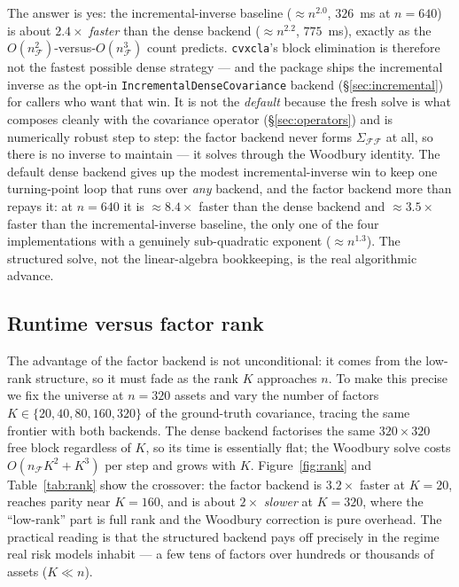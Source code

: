 \documentclass[11pt]{article}
\newcommand{\Sig}{\Sigma}
\newcommand{\F}{\mathcal{F}}        %
\begin{document}
The answer is yes: the incremental-inverse baseline ($\approx n^{2.0}$, $326$~ms at
$n=640$) is about $2.4\times$ \emph{faster} than the dense backend
($\approx n^{2.2}$, $775$~ms), exactly as the $O(n_\F^2)$-versus-$O(n_\F^3)$ count
predicts. \texttt{cvxcla}'s block elimination is therefore not the fastest possible
dense strategy --- and the package ships the incremental inverse as the opt-in
\texttt{IncrementalDenseCovariance} backend (\S\ref{sec:incremental}) for callers
who want that win. It is not the \emph{default} because the fresh solve is what
composes cleanly with the covariance operator (\S\ref{sec:operators}) and is
numerically robust step to step: the factor backend never forms $\Sig_{\F\F}$ at
all, so there is no inverse to maintain --- it solves through the Woodbury
identity. The default dense backend gives up the modest incremental-inverse win to
keep one turning-point loop that runs over \emph{any} backend, and the factor
backend more than repays it: at $n=640$ it is $\approx 8.4\times$ faster than the
dense backend and $\approx 3.5\times$ faster than the incremental-inverse baseline,
the only one of the four implementations with a genuinely sub-quadratic exponent
($\approx n^{1.3}$). The structured solve, not the linear-algebra bookkeeping, is
the real algorithmic advance.

\subsection{Runtime versus factor rank}
\label{sec:rankscaling}

The advantage of the factor backend is not unconditional: it comes from the
low-rank structure, so it must fade as the rank $K$ approaches $n$. To make this
precise we fix the universe at $n = 320$ assets and vary the number of factors
$K \in \{20, 40, 80, 160, 320\}$ of the ground-truth covariance, tracing the same
frontier with both backends. The dense backend factorises the same $320 \times
320$ free block regardless of $K$, so its time is essentially flat; the Woodbury
solve costs $O(n_\F K^2 + K^3)$ per step and grows with $K$. Figure~\ref{fig:rank}
and Table~\ref{tab:rank} show the crossover: the factor backend is $3.2\times$
faster at $K=20$, reaches parity near $K=160$, and is about $2\times$ \emph{slower}
at $K = 320$, where the ``low-rank'' part is full rank and the Woodbury correction
is pure overhead. The practical reading is that the structured backend pays off
precisely in the regime real risk models inhabit --- a few tens of factors over
hundreds or thousands of assets ($K \ll n$).
\end{document}
